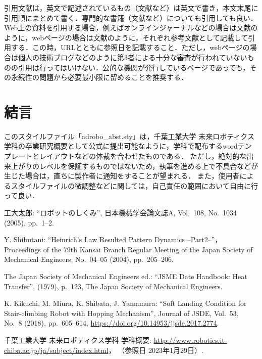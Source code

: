 \documentclass[10pt]{jarticle}
\begin{document}
    引用文献は，英文で記述されているもの（文献\cite{Shibutani2004}など）は英文で書き，本文末尾に引用順にまとめて書く．専門的な書籍（文献\cite{Handbook1979}など）についても引用しても良い．
    Web上の資料を引用する場合，例えばオンラインジャーナルなどの場合は文献\cite{Kikuchi2017}のように，webページの場合は文献\cite{Adrobo2019}のように，それぞれ参考文献として記載して引用する．この時，URLとともに参照日を記載すること．ただし，webページの場合は個人の技術ブログなどのように第3者による十分な審査が行われていないものの引用は行ってはいけない．公的な機関が発行しているページであっても，その永続性の問題から必要最小限に留めることを推奨する．
        
    \section{結\hspace{2zw}言}%
    このスタイルファイル「adrobo\_abst.sty」は，千葉工業大学 未来ロボティクス学科の卒業研究概要として公式に提出可能なように，学科で配布するwordテンプレートとレイアウトなどの体裁を合わせたものである．
    ただし，絶対的な出来上がりのレベルを保証するものではないため，執筆を進める上で不具合などが生じた場合は，直ちに製作者に通知をすることが望まれる．
    また，使用者によるスタイルファイルの微調整などに関しては，自己責任の範囲において自由に行って良い．
    
    \vspace{5truemm}
    {\footnotesize
        \begin{thebibliography}{99}
            
            工大太郎: ``ロボットのしくみ'', 
            日本機械学会論文誌A, 
            Vol.~108, No.~1034 (2005), pp.~1--2.
            
            Y. Shibutani: ``Heinrich's Law Resulted Pattern Dynamics --Part2--''，
            Proceedings of the 79th Kansai Branch Regular Meeting of the Japan Society of Mechanical Engineers,  
            No.~04--05 (2004), pp.~205--206.
            
            The Japan Society of Mechanical Engineers ed.: ``JSME Date Handbook: Heat Transfer'', 
            (1979), p.~123, The Japan Society of Mechanical Engineers.
            
            K. Kikuchi, M. Miura, K. Shibata, J. Yamamura: ``Soft Landing Condition for Stair-climbing Robot with Hopping Mechanism'', 
            Journal of JSDE, Vol.~53, No.~8 (2018), pp.~605--614, \url{https://doi.org/10.14953/jjsde.2017.2774}.
            
            千葉工業大学 未来ロボティクス学科 学科概要: 
            \url{http://www.robotics.it-chiba.ac.jp/ja/subject/index.html}， 
            （参照日 2023年1月29日）. 
            
        \end{thebibliography}
    }
    \normalsize
    
\end{document}

